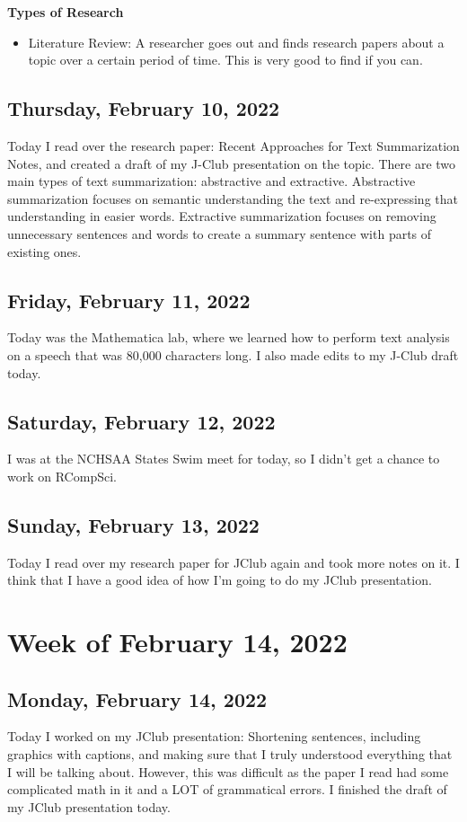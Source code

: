 \documentclass[11pt,letterpaper]{article}
\begin{document}
\textbf{Types of Research}
\begin{itemize}
    \item Literature Review: A researcher goes out and finds research papers about a topic over a certain period of time. This is very good to find if you can. 
\end{itemize}


\subsection{Thursday, February 10, 2022}
Today I read over the research paper: Recent Approaches for Text Summarization Notes, and created a draft of my J-Club presentation on the topic. There are two main types of text summarization: abstractive and extractive. Abstractive summarization focuses on semantic understanding the text and re-expressing that understanding in easier words. Extractive summarization focuses on removing unnecessary sentences and words to create a summary sentence with parts of existing ones.

\subsection{Friday, February 11, 2022}
Today was the Mathematica lab, where we learned how to perform text analysis on a speech that was 80,000 characters long. I also made edits to my J-Club draft today.

\subsection{Saturday, February 12, 2022}
I was at the NCHSAA States Swim meet for today, so I didn't get a chance to work on RCompSci.

\subsection{Sunday, February 13, 2022}
Today I read over my research paper for JClub again and took more notes on it. I think that I have a good idea of how I'm going to do my JClub presentation.

\section{Week of February 14, 2022}
\subsection{Monday, February 14, 2022}
Today I worked on my JClub presentation: Shortening sentences, including graphics with captions, and making sure that I truly understood everything that I will be talking about. However, this was difficult as the paper I read had some complicated math in it and a LOT of grammatical errors. I finished the draft of my JClub presentation today.
\end{document}
